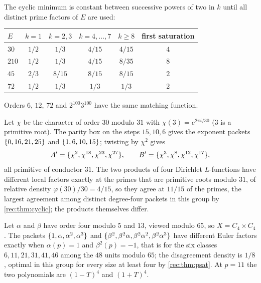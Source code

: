 \begin{remark}[Plateaus]\label{rec:rem:cplateau}
The cyclic minimum is constant between successive powers of two in $k$ until all distinct prime factors
of $E$ are used:
\begin{center}
\begin{tabular}{@{}lccccc@{}}\toprule
$E$ & $k=1$ & $k=2,3$ & $k=4,\dots,7$ & $k\ge8$ & first saturation\\\midrule
$30$ & $1/2$ & $1/3$ & $4/15$ & $4/15$ & $4$\\
$210$ & $1/2$ & $1/3$ & $4/15$ & $8/35$ & $8$\\
$45$ & $2/3$ & $8/15$ & $8/15$ & $8/15$ & $2$\\
$72$ & $1/2$ & $1/3$ & $1/3$ & $1/3$ & $2$\\\bottomrule
\end{tabular}
\end{center}
Orders $6$, $12$, $72$ and $2^{100}3^{100}$ have the same matching function.
\end{remark}

\begin{example}\label{rec:ex:c31}
Let $\chi$ be the character of order $30$ modulo $31$ with $\chi(3)=e^{2\pi i/30}$ ($3$ is a primitive root). The parity box on the
steps $15,10,6$ gives the exponent packets $\{0,16,21,25\}$ and $\{1,6,10,15\}$; twisting by $\chi^2$ gives
\[
 A'=\{\chi^2,\chi^{18},\chi^{23},\chi^{27}\},\qquad B'=\{\chi^3,\chi^8,\chi^{12},\chi^{17}\},
\]
all primitive of conductor $31$. The two products of four Dirichlet $L$-functions have different local
factors exactly at the primes that are primitive roots modulo $31$, of relative density $\varphi(30)/30=4/15$, so
they agree at $11/15$ of the primes, the largest agreement among distinct degree-four packets in this group
by \cref{rec:thm:cyclic}; the products themselves differ.
\end{example}

\begin{example}\label{rec:ex:c65}
Let $\alpha$ and $\beta$ have order four modulo $5$ and $13$, viewed modulo $65$, so $X=C_4\times C_4$. The packets
$\{1,\alpha,\alpha^2,\alpha^3\}$ and $\{\beta^2,\beta^2\alpha,\beta^2\alpha^2,\beta^2\alpha^3\}$ have different Euler factors exactly when $\alpha(p)=1$ and $\beta^2(p)=-1$, that is
for the six classes $6,11,21,31,41,46$ among the $48$ units modulo $65$; the disagreement density is $1/8$, optimal
in this group for every size at least four by \cref{rec:thm:psat}. At $p=11$ the two polynomials are $(1-T)^4$
and $(1+T)^4$.
\end{example}

